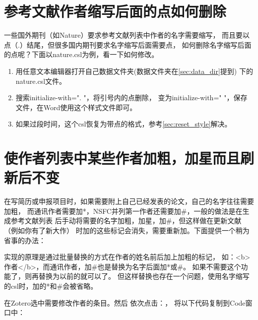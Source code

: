 \documentclass[cn,11pt,chinese]{elegantbook}
\begin{document}
		\section{参考文献作者缩写后面的点如何删除}\label{sec:authorPoint}
			一些国外期刊（如Nature）要求参考文献列表中作者的名字需要缩写，
			而且要以点（.）结尾，但很多国内期刊要求名字缩写后面需要点，
			如何删除名字缩写后面的点呢？下面以nature.csl为例，看一下如何修改。
			\begin{enumerate}
				\item 用任意文本编辑器打开自己数据文件夹(数据文件夹在\cref{sec:data_dir}提到)
				下的nature.csl文件。
				\item 搜索initialize-with=". "，将引号内的点删除，
				变为initialize-with=" "，保存文件，在Word使用这个样式文件即可。
				\item 如果过段时间，这个csl恢复为带点的格式，参考\cref{sec:reset_style}解决。
			\end{enumerate}

		\section{使作者列表中某些作者加粗，加星而且刷新后不变}\label{sec:authorBold}

		在写简历或申报项目时，如果需要附上自己已经发表的论文，自己的名字往往需要加粗，
		而通讯作者需要加*，NSFC并列第一作者还需要加\#，一般的做法是在生成参考文献列表
		后手动将需要的名字加粗，加星，加\#，但这样做在更新文献（例如你有了新大作）
		时加的这些标记会消失，需要重新加。下面提供一个稍为省事的办法：

		实现的原理是通过批量替换的方式在作者的姓名前后加上加粗的标记，
		如：<b>作者</b>，而通讯作者，加\#也是替换为名字后面加*或\#。
		如果不需要这个功能了，则再替换为以前的就可以了。
		但这样替换也存在一个问题，使用名字缩写的csl时，加的*和\#会被省略。

		在Zotero选中需要修改作者的条目。然后
		依次点击：，
		将以下代码复制到Code窗口中：
\end{document}
